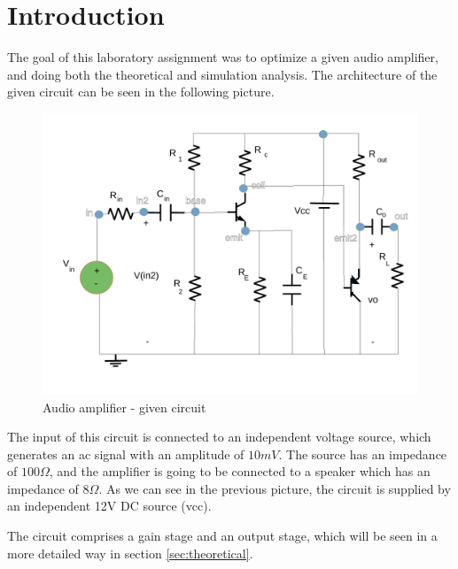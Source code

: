 \section{Introduction}
\label{sec:introduction}

\par The goal of this laboratory assignment was to optimize a given audio amplifier, and doing both the theoretical and simulation analysis. The architecture of the given circuit can be seen in the following picture.

\begin{figure}[H] \centering
	\includegraphics[width=1\linewidth]{lab4.pdf}
	\caption{Audio amplifier - given circuit}
	\label{fig:1}
\end{figure}

\par The input of this circuit is connected to an independent voltage source, which generates an ac signal with an amplitude of $10mV$. The source has an impedance of $100\Omega$, and the amplifier is going to be connected to a speaker which has an impedance of $8\Omega$. As we can see in the previous picture, the circuit is supplied by an independent 12V DC source (vcc).
\par The circuit comprises a gain stage and an output stage, which will be seen in a more detailed way in section \ref{sec:theoretical}. 

\newpage

